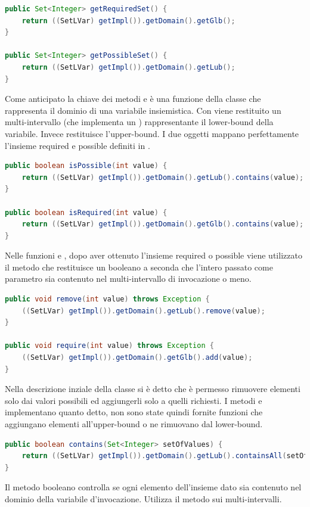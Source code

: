 \begin{lstlisting}[language = Java,
                   caption = {metodi getter per il dominio.}]
public Set<Integer> getRequiredSet() {
	return ((SetLVar) getImpl()).getDomain().getGlb();
}

public Set<Integer> getPossibleSet() {
	return ((SetLVar) getImpl()).getDomain().getLub();
}
\end{lstlisting}
Come anticipato la chiave dei metodi  e 
 è una funzione della classe
 che rappresenta il dominio di una variabile insiemistica.
Con  viene restituito un multi-intervallo (che implementa un
) rappresentante il lower-bound della variabile.
Invece  restituisce l'upper-bound. I due oggetti
mappano perfettamente l'insieme required e possible definiti in .

\begin{lstlisting}[language = Java,
                   caption = {un intero è possibile o richiesto?.}]
public boolean isPossible(int value) {
	return ((SetLVar) getImpl()).getDomain().getLub().contains(value);
}

public boolean isRequired(int value) {
	return ((SetLVar) getImpl()).getDomain().getGlb().contains(value);
}
\end{lstlisting}
Nelle funzioni  e , dopo aver ottenuto 
l'insieme required o possible viene utilizzato
 il metodo  che restituisce un booleano a seconda che
l'intero passato come parametro sia contenuto nel multi-intervallo di 
invocazione o meno.

\begin{lstlisting}[language = Java,
                   caption = {inserire e rimuovere elementi.}]
public void remove(int value) throws Exception {
	((SetLVar) getImpl()).getDomain().getLub().remove(value);	
}

public void require(int value) throws Exception {
	((SetLVar) getImpl()).getDomain().getGlb().add(value);	
}
\end{lstlisting}
Nella descrizione inziale della classe si è detto che è 
permesso rimuovere elementi solo dai valori possibili ed aggiungerli solo a
quelli richiesti. I metodi  e  implementano 
quanto detto, non sono
state quindi fornite funzioni che aggiungano elementi all'upper-bound
o ne rimuovano dal lower-bound.

\begin{lstlisting}[language = Java,
                   caption = {inclusione insiemistica.}]
public boolean contains(Set<Integer> setOfValues) {
	return ((SetLVar) getImpl()).getDomain().getLub().containsAll(setOfValues);
}
\end{lstlisting}
Il metodo booleano  controlla se ogni elemento dell'insieme
dato sia contenuto nel dominio della variabile d'invocazione. 
Utilizza il metodo  sui multi-intervalli.

